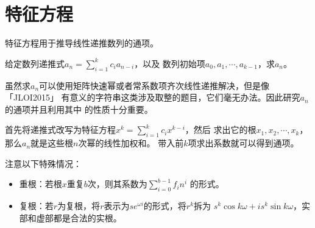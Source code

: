 \section{特征方程}
特征方程用于推导线性递推数列的通项。

给定数列递推式$a_n=\displaystyle \sum_{i=1}^k{c_ia_{n-i}}$，以及
数列初始项$a_0,a_1,\cdots,a_{k-1}$，求$a_n$。

虽然求$a_n$可以使用矩阵快速幂或者常系数项齐次线性递推解决，但是像「JLOI2015」
有意义的字符串这类涉及取整的题目，它们毫无办法。因此研究$a_n$的通项并且利用其中
的性质十分重要。

首先将递推式改写为特征方程$x^k=\displaystyle \sum_{i=1}^k{c_ix^{k-i}}$，然后
求出它的根$x_1,x_2,\cdots,x_k$，那么$a_n$就是这些根$n$次幂的线性加权和。
带入前$k$项求出系数就可以得到通项。

注意以下特殊情况：
\begin{itemize}
    \item 重根：若根$x$重复$b$次，则其系数为$\displaystyle \sum_{i=0}^{b-1}{f_in^i}$
    的形式。
    \item 复根：若$r$为复根，将$r$表示为$se^{\omega i}$的形式，将$r^k$拆为
    $s^k\cos k\omega+is^k\sin k\omega$，实部和虚部都是合法的实根。
\end{itemize}


